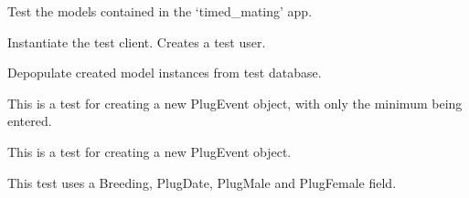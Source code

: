 \documentclass[letterpaper,10pt,english]{sphinxmanual}
\begin{document}
\begin{fulllineitems}
\label{timed_mating:mousedb.timed_mating.tests.Timed_MatingModelTests}
Test the models contained in the `timed\_mating' app.

\begin{fulllineitems}
\label{timed_mating:mousedb.timed_mating.tests.Timed_MatingModelTests.setUp}
Instantiate the test client.  Creates a test user.

\end{fulllineitems}


\begin{fulllineitems}
\label{timed_mating:mousedb.timed_mating.tests.Timed_MatingModelTests.tearDown}
Depopulate created model instances from test database.

\end{fulllineitems}


\begin{fulllineitems}
\label{timed_mating:mousedb.timed_mating.tests.Timed_MatingModelTests.test_create_plugevent_minimal}
This is a test for creating a new PlugEvent object, with only the minimum being entered.

\end{fulllineitems}


\begin{fulllineitems}
\label{timed_mating:mousedb.timed_mating.tests.Timed_MatingModelTests.test_create_plugevent_most_fields}
This is a test for creating a new PlugEvent object.

This test uses a Breeding, PlugDate, PlugMale and PlugFemale field.

\end{fulllineitems}


\end{fulllineitems}
\end{document}
